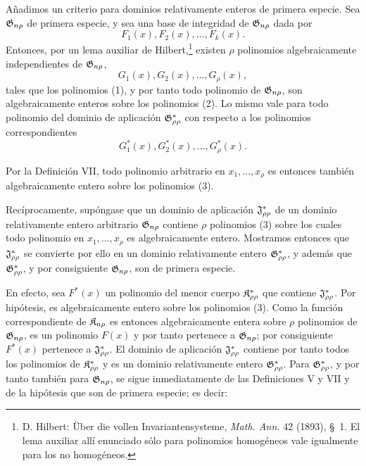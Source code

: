 \documentclass[11pt]{article}
\begin{document}
Añadimos un criterio para dominios relativamente enteros de primera especie. Sea $\mathfrak{G}_{n\rho}$ de primera especie, y sea una base de integridad de $\mathfrak{G}_{n\rho}$ dada por
\begin{equation}
  F_1(x),F_2(x),\ldots,F_k(x).
\tag{1}
\end{equation}
Entonces, por un lema auxiliar de Hilbert,\footnote{D. Hilbert: Über die vollen Invariantensysteme, \emph{Math. Ann.} 42 (1893), \S\ 1. El lema auxiliar allí enunciado sólo para polinomios homogéneos vale igualmente para los no homogéneos.} existen $\rho$ polinomios algebraicamente independientes de $\mathfrak{G}_{n\rho}$,
\begin{equation}
  G_1(x),G_2(x),\ldots,G_\rho(x),
\tag{2}
\end{equation}
tales que los polinomios (1), y por tanto todo polinomio de $\mathfrak{G}_{n\rho}$, son algebraicamente enteros sobre los polinomios (2). Lo mismo vale para todo polinomio del dominio de aplicación $\mathfrak{G}^*_{\rho\rho}$ con respecto a los polinomios correspondientes
\begin{equation}
  G_1^*(x),G_2^*(x),\ldots,G_\rho^*(x).
\tag{3}
\end{equation}

Por la Definición VII, todo polinomio arbitrario en $x_1,\ldots,x_\rho$ es entonces también algebraicamente entero sobre los polinomios (3).

Recíprocamente, supóngase que un dominio de aplicación $\mathfrak{J}^*_{\rho\rho}$ de un dominio relativamente entero arbitrario $\mathfrak{G}_{n\rho}$ contiene $\rho$ polinomios (3) sobre los cuales todo polinomio en $x_1,\ldots,x_\rho$ es algebraicamente entero. Mostramos entonces que $\mathfrak{J}^*_{\rho\rho}$ se convierte por ello en un dominio relativamente entero $\mathfrak{G}^*_{\rho\rho}$, y además que $\mathfrak{G}^*_{\rho\rho}$, y por consiguiente $\mathfrak{G}_{n\rho}$, son de primera especie.

En efecto, sea $F^*(x)$ un polinomio del menor cuerpo $\mathfrak{K}^*_{\rho\rho}$ que contiene $\mathfrak{J}^*_{\rho\rho}$. Por hipótesis, es algebraicamente entero sobre los polinomios (3). Como la función correspondiente de $\mathfrak{K}_{n\rho}$ es entonces algebraicamente entera sobre $\rho$ polinomios de $\mathfrak{G}_{n\rho}$, es un polinomio $F(x)$ y por tanto pertenece a $\mathfrak{G}_{n\rho}$; por consiguiente $F^*(x)$ pertenece a $\mathfrak{J}^*_{\rho\rho}$. El dominio de aplicación $\mathfrak{J}^*_{\rho\rho}$ contiene por tanto todos los polinomios de $\mathfrak{K}^*_{\rho\rho}$ y es un dominio relativamente entero $\mathfrak{G}^*_{\rho\rho}$. Para $\mathfrak{G}^*_{\rho\rho}$, y por tanto también para $\mathfrak{G}_{n\rho}$, se sigue inmediatamente de las Definiciones V y VII y de la hipótesis que son de primera especie; es decir:
\end{document}
